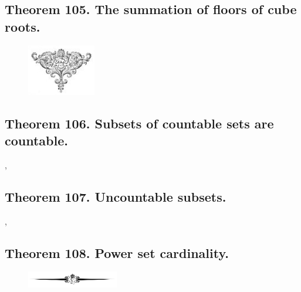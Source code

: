 \documentclass[preview]{standalone}
\begin{document}
\subsection[The summation of floors of cube roots.]{
    \color{section} Theorem 105. \color{black} The summation of floors of cube roots.
}

\begin{figure}[!h]
    \centering
    \includegraphics[width=3cm]{../resources/jpg/2.4.sequences.and.summations/symbol6.jpg}
\end{figure}
\pagebreak


\subsection[Subsets of countable sets are countable.]{
    \color{section} Theorem 106. \color{black} Subsets of countable sets are countable.
}

\sep


\subsection[Uncountable subsets imply an uncountable superset.]{
    \color{section} Theorem 107. \color{black} Uncountable subsets.
}

\sep


\subsection[Power set cardinality.]{
    \color{section} Theorem 108. \color{black} Power set cardinality.
}

\begin{figure}[!h]
    \centering
    \includegraphics[width=4cm]{../resources/jpg/2.4.sequences.and.summations/border.png}
\end{figure}
\pagebreak
\end{document}
